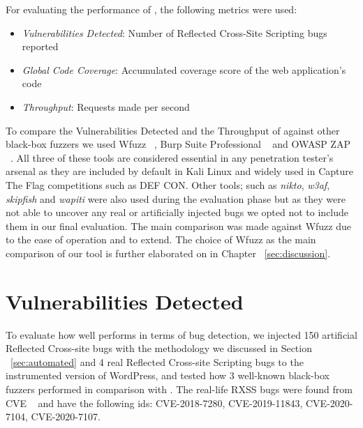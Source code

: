 For evaluating the performance of \pname{}, the following metrics were used:
\begin{itemize}
	\item \emph{Vulnerabilities Detected}: Number of Reflected Cross-Site Scripting bugs reported
	\item \emph{Global Code Coverage}: Accumulated coverage score of the web application's code
	\item \emph{Throughput}: Requests made per second
\end{itemize}

To compare the Vulnerabilities Detected and the Throughput of \pname{} against other black-box fuzzers we used Wfuzz ~\cite{wfuzz}, Burp Suite Professional ~\cite{burp} and OWASP ZAP ~\cite{ owaspzap}. All three of these tools are considered essential in any penetration tester's arsenal as they are included by default in Kali Linux and widely used in Capture The Flag competitions such as DEF CON. Other tools; such as \emph{nikto}, \emph{w3af}, \emph{skipfish} and \emph{wapiti} were also used during the evaluation phase but as they were not able to uncover any real or artificially injected bugs we opted not to include them in our final evaluation. The main comparison was made against Wfuzz due to the ease of operation and to extend. The choice of Wfuzz as the main comparison of our tool is further elaborated on in Chapter ~\ref{sec:discussion}.

\section{Vulnerabilities Detected}
To evaluate how well \pname{} performs in terms of bug detection, we injected 150 artificial  Reflected Cross-site bugs with the methodology we discussed in Section ~\ref{sec:automated} and 4 real Reflected Cross-site Scripting bugs to the instrumented version of WordPress, and tested how 3 well-known black-box fuzzers performed in comparison with \pname{}. The real-life RXSS bugs were found from CVE ~\cite{cve} and have the following ids: CVE-2018-7280, CVE-2019-11843, CVE-2020-7104, CVE-2020-7107.

